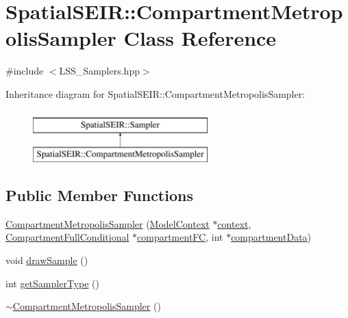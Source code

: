 \hypertarget{classSpatialSEIR_1_1CompartmentMetropolisSampler}{\section{Spatial\-S\-E\-I\-R\-:\-:Compartment\-Metropolis\-Sampler Class Reference}
\label{classSpatialSEIR_1_1CompartmentMetropolisSampler}
}


{\ttfamily \#include $<$L\-S\-S\-\_\-\-Samplers.\-hpp$>$}

Inheritance diagram for Spatial\-S\-E\-I\-R\-:\-:Compartment\-Metropolis\-Sampler\-:\begin{figure}[H]
\begin{center}
\leavevmode
\includegraphics[height=2.000000cm]{classSpatialSEIR_1_1CompartmentMetropolisSampler}
\end{center}
\end{figure}
\subsection*{Public Member Functions}
\begin{DoxyCompactItemize}
\item 
\hyperlink{classSpatialSEIR_1_1CompartmentMetropolisSampler_af86755297ccbf562a108e653c8cb464d}{Compartment\-Metropolis\-Sampler} (\hyperlink{classSpatialSEIR_1_1ModelContext}{Model\-Context} $\ast$\hyperlink{classSpatialSEIR_1_1CompartmentMetropolisSampler_a17778f2c1b66d39a71a8fb6f5f648387}{context}, \hyperlink{classSpatialSEIR_1_1CompartmentFullConditional}{Compartment\-Full\-Conditional} $\ast$\hyperlink{classSpatialSEIR_1_1CompartmentMetropolisSampler_a917c4ed20e389f460e1cef15aeb51570}{compartment\-F\-C}, int $\ast$\hyperlink{classSpatialSEIR_1_1CompartmentMetropolisSampler_a82cb72e43365eddeec151023eca5af54}{compartment\-Data})
\item 
void \hyperlink{classSpatialSEIR_1_1CompartmentMetropolisSampler_a9d19f29ea0a8b86abb3e2082b469aed5}{draw\-Sample} ()
\item 
int \hyperlink{classSpatialSEIR_1_1CompartmentMetropolisSampler_a249b461e6f848c20f274bac7cae76e95}{get\-Sampler\-Type} ()
\item 
\hyperlink{classSpatialSEIR_1_1CompartmentMetropolisSampler_aadd072a410f46715097df75db53385be}{$\sim$\-Compartment\-Metropolis\-Sampler} ()
\end{DoxyCompactItemize}
